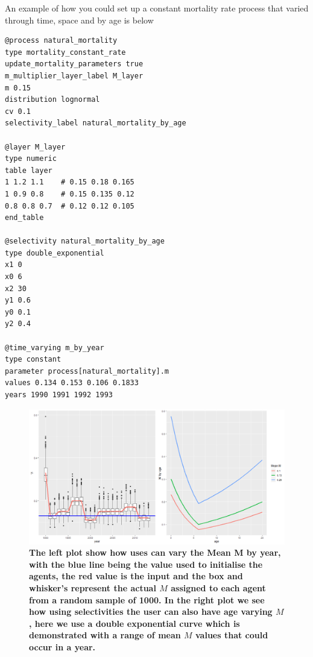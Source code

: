 An example of how you could set up a constant mortality rate process that varied through time, space and by age is below

{\small{\begin{verbatim}
@process natural_mortality
type mortality_constant_rate
update_mortality_parameters true
m_multiplier_layer_label M_layer
m 0.15
distribution lognormal
cv 0.1
selectivity_label natural_mortality_by_age

@layer M_layer
type numeric
table layer
1 1.2 1.1    # 0.15 0.18 0.165
1 0.9 0.8    # 0.15 0.135 0.12
0.8 0.8 0.7  # 0.12 0.12 0.105
end_table

@selectivity natural_mortality_by_age
type double_exponential
x1 0
x0 6
x2 30
y1 0.6
y0 0.1
y2 0.4

@time_varying m_by_year
type constant
parameter process[natural_mortality].m
values 0.134 0.153 0.106 0.1833
years 1990 1991 1992 1993 
\end{verbatim}}}

\begin{figure}[h!]
	\centering
	\includegraphics[scale=0.45]{Figures/Time_age_varying_M.png}
	\caption{\textbf{The left plot show how uses can vary the Mean M by year, with the blue line being the value used to initialise the agents, the red value is the input and the box and whisker's represent the actual $M$ assigned to each agent from a random sample of 1000. In the right plot we see how using selectivities the user can also have age varying $M$, here we use a double exponential curve which is demonstrated with a range of mean $M$ values that could occur in a year.}}
	\label{fig:varying_M}
\end{figure}


